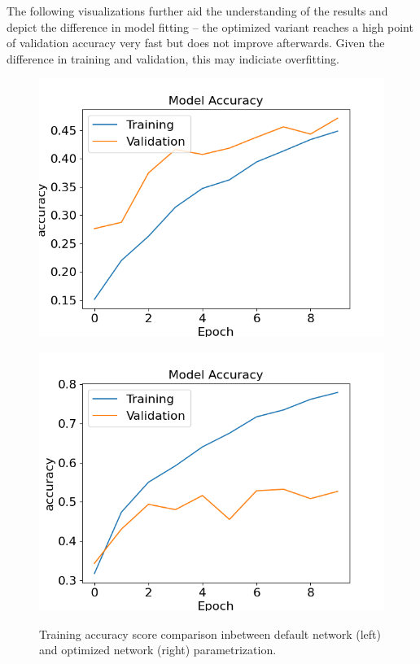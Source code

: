 The following visualizations further aid the understanding of the results and depict the difference in model fitting -- the optimized 
variant reaches a high point of validation accuracy very fast but does not improve afterwards.
Given the difference in training and validation, this may indiciate overfitting.
\begin{figure}[H]
  \centering
  \begin{minipage}{.5\textwidth}
    \centering
    \includegraphics[width=1.0\linewidth]{img/training_history_standard.png}
    \label{fig:training_history_standard}
  \end{minipage}%
  \begin{minipage}{.5\textwidth}
    \centering
    \includegraphics[width=1.0\linewidth]{img/training_history_optimal.png}
    \label{fig:training_history_optimal}
  \end{minipage}
  \caption{Training accuracy score comparison inbetween default network (left) and optimized network (right) parametrization.}
  \label{fig:training_history_overview}
\end{figure}


